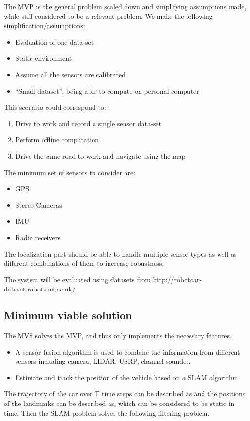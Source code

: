 The \gls{MVP} is the general problem scaled down and simplifying
assumptions made, while still considered to be a relevant problem. We make the following
simplification/assumptions:
\begin{itemize}
\item Evaluation of one data-set
\item Static environment
\item Assume all the sensors are calibrated
\item ``Small dataset'', being able to compute on personal computer
\end{itemize}
This scenario could correspond to:
\begin{enumerate}
\item Drive to work and record a single sensor data-set
\item Perform offline computation
\item Drive the same road to work and navigate using the map
\end{enumerate}
The minimum set of sensors to consider are:
\begin{itemize}
\item GPS
\item Stereo Cameras
\item IMU
\item Radio receivers
\end{itemize}

The localization part should be able to handle multiple sensor types as well as different combinations of them to increase robustness.


The system will be evaluated using datasets from
\url{http://robotcar-dataset.robots.ox.ac.uk/}

\subsection{Minimum viable solution}


The \gls{MVS} solves the \gls{MVP}, and thus only implements the necessary
features.
\begin{itemize}
\item A sensor fusion algorithm is used to combine the information
  from different sensors including camera, LIDAR, USRP, channel
  sounder.
\item Estimate and track the position of the vehicle based on a SLAM
  algorithm.
\end{itemize}

The trajectory of the car over T time steps can be described as   and
the positions of the landmarks can be described as, which can be
considered to be static in time. Then the \gls{SLAM} problem solves
the following filtering problem.

